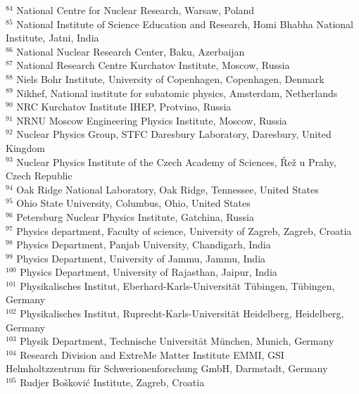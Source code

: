 \begin{flushleft}
$^{84}$ National Centre for Nuclear Research, Warsaw, Poland\\
$^{85}$ National Institute of Science Education and Research, Homi Bhabha National Institute, Jatni, India\\
$^{86}$ National Nuclear Research Center, Baku, Azerbaijan\\
$^{87}$ National Research Centre Kurchatov Institute, Moscow, Russia\\
$^{88}$ Niels Bohr Institute, University of Copenhagen, Copenhagen, Denmark\\
$^{89}$ Nikhef, National institute for subatomic physics, Amsterdam, Netherlands\\
$^{90}$ NRC Kurchatov Institute IHEP, Protvino, Russia\\
$^{91}$ NRNU Moscow Engineering Physics Institute, Moscow, Russia\\
$^{92}$ Nuclear Physics Group, STFC Daresbury Laboratory, Daresbury, United Kingdom\\
$^{93}$ Nuclear Physics Institute of the Czech Academy of Sciences, \v{R}e\v{z} u Prahy, Czech Republic\\
$^{94}$ Oak Ridge National Laboratory, Oak Ridge, Tennessee, United States\\
$^{95}$ Ohio State University, Columbus, Ohio, United States\\
$^{96}$ Petersburg Nuclear Physics Institute, Gatchina, Russia\\
$^{97}$ Physics department, Faculty of science, University of Zagreb, Zagreb, Croatia\\
$^{98}$ Physics Department, Panjab University, Chandigarh, India\\
$^{99}$ Physics Department, University of Jammu, Jammu, India\\
$^{100}$ Physics Department, University of Rajasthan, Jaipur, India\\
$^{101}$ Physikalisches Institut, Eberhard-Karls-Universit\"{a}t T\"{u}bingen, T\"{u}bingen, Germany\\
$^{102}$ Physikalisches Institut, Ruprecht-Karls-Universit\"{a}t Heidelberg, Heidelberg, Germany\\
$^{103}$ Physik Department, Technische Universit\"{a}t M\"{u}nchen, Munich, Germany\\
$^{104}$ Research Division and ExtreMe Matter Institute EMMI, GSI Helmholtzzentrum f\"ur Schwerionenforschung GmbH, Darmstadt, Germany\\
$^{105}$ Rudjer Bo\v{s}kovi\'{c} Institute, Zagreb, Croatia\\

\end{flushleft}

